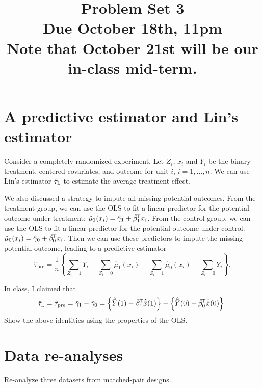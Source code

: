 \documentclass[11pt]{article}
\theoremstyle{definition}
\newcommand*{\tran }{^{\mkern-1.5mu\mathsf{T}}}
\begin{document}
\doublespacing
\title{\bf  Problem Set 3\\
Due October 18th, 11pm\\
Note that October 21st will be our in-class mid-term.
}
\date{}
\maketitle


\section{A predictive estimator and Lin's estimator}

Consider a completely randomized experiment. Let $Z_i$, $x_i$ and $Y_i$ be the binary treatment, centered covariates, and outcome for unit $i$, $i=1,\ldots, n.$ We can use Lin's estimator $\hat{\tau}_\textsc{L}$ to estimate the average treatment effect.

We also discussed a strategy to impute all missing potential outcomes. From the treatment group, we can use the OLS to fit a linear predictor for the potential outcome under treatment: $\hat{\mu}_1(x_i) = \hat{\gamma}_1 + \hat{\beta}_1\tran  x_i$. From the control group, we can use the OLS to fit a linear predictor for the potential outcome under control: $\hat{\mu}_0(x_i) = \hat{\gamma}_0 + \hat{\beta}_0\tran  x_i$. Then we can use these predictors to impute the missing potential outcome, leading to a predictive estimator
$$
\hat{\tau}_{\text{pre}} = \frac{1}{n}
\left\{
\sum_{Z_i=1} Y_i + \sum_{Z_i=0} \hat{\mu}_1(x_i)- \sum_{Z_i=1} \hat{\mu}_0(x_i) - \sum_{Z_i=0} Y_i
\right\} .
$$

In class, I claimed that
$$
\hat{\tau}_\textsc{L} = \hat{\tau}_{\text{pre}}  = \hat{\gamma}_1 - \hat{\gamma}_0
= \left\{  \hat{\bar{Y}}(1) - \hat{\beta}_1\tran  \hat{\bar{x}}(1) \right\}  
-  \left\{  \hat{\bar{Y}}(0) - \hat{\beta}_0\tran  \hat{\bar{x}}(0) \right\} . 
$$
Show the above identities using the properties of the OLS. 


\section{Data re-analyses}

Re-analyze three datasets from matched-pair designs. 
\end{document}
